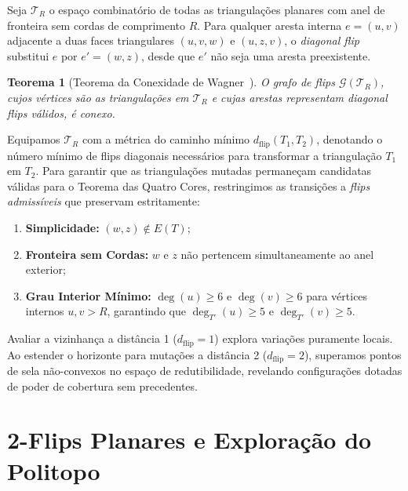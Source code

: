 \documentclass[11pt,a4paper]{article}
\theoremstyle{plain}
\newtheorem{theorem}{Teorema}[section]
\theoremstyle{definition}
\begin{document}
Seja $\mathcal{T}_R$ o espaço combinatório de todas as triangulações planares com anel de fronteira sem cordas de comprimento $R$. Para qualquer aresta interna $e = (u, v)$ adjacente a duas faces triangulares $(u, v, w)$ e $(u, z, v)$, o \emph{diagonal flip} substitui $e$ por $e' = (w, z)$, desde que $e'$ não seja uma aresta preexistente.

\begin{theorem}[Teorema da Conexidade de Wagner~\cite{wagner1936bemerkungen}]
O grafo de flips $\mathcal{G}(\mathcal{T}_R)$, cujos vértices são as triangulações em $\mathcal{T}_R$ e cujas arestas representam diagonal flips válidos, é conexo.
\end{theorem}

Equipamos $\mathcal{T}_R$ com a métrica do caminho mínimo $d_{\text{flip}}(T_1, T_2)$, denotando o número mínimo de flips diagonais necessários para transformar a triangulação $T_1$ em $T_2$. Para garantir que as triangulações mutadas permaneçam candidatas válidas para o Teorema das Quatro Cores, restringimos as transições a \emph{flips admissíveis} que preservam estritamente:
\begin{enumerate}
    \item \textbf{Simplicidade:} $(w, z) \notin E(T)$;
    \item \textbf{Fronteira sem Cordas:} $w$ e $z$ não pertencem simultaneamente ao anel exterior;
    \item \textbf{Grau Interior Mínimo:} $\deg(u) \ge 6$ e $\deg(v) \ge 6$ para vértices internos $u, v > R$, garantindo que $\deg_{T'}(u) \ge 5$ e $\deg_{T'}(v) \ge 5$.
\end{enumerate}
Avaliar a vizinhança a distância 1 ($d_{\text{flip}} = 1$) explora variações puramente locais. Ao estender o horizonte para mutações a distância 2 ($d_{\text{flip}} = 2$), superamos pontos de sela não-convexos no espaço de redutibilidade, revelando configurações dotadas de poder de cobertura sem precedentes.

\section{2-Flips Planares e Exploração do Politopo}
\end{document}
